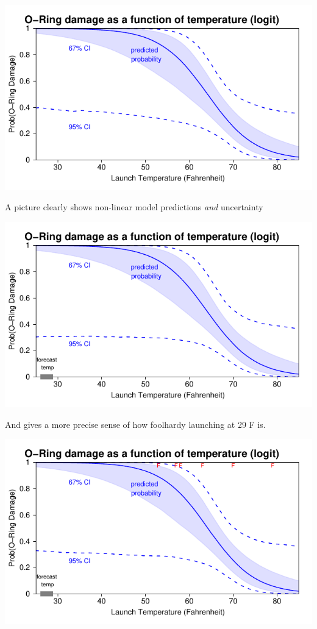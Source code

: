 \documentclass[pdflatex,landscape,titlepage]{foils}
\begin{document}
\color{black}
\begin{center}
\includegraphics[width=10.5 in]{chall1}
\end{center}

A picture clearly shows non-linear model predictions \emph{and} uncertainty

\foilhead[-0.75in]{}

\color{black}
\begin{center}
\includegraphics[width=10.5 in]{chall2}
\end{center}

And gives a more precise sense of how foolhardy launching at 29 F is.

\foilhead[-0.75in]{}

\color{black}
\begin{center}
\includegraphics[width=10.5 in]{chall3}
\end{center}
\end{document}
